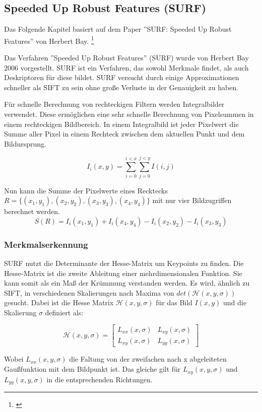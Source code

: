 \subsection{Speeded Up Robust Features (SURF)}
Das Folgende Kapitel basiert auf dem Paper ''SURF: Speeded Up Robust Features'' von Herbert Bay.
\footnote{\cite{Bay:2008:SRF:1370312.1370556}}

Das Verfahren ''Speeded Up Robust Features'' (SURF) wurde von Herbert Bay 2006 vorgestellt. SURF ist ein Verfahren, das sowohl Merkmale findet, als auch Deskriptoren für diese bildet.
SURF versucht durch einige Approximationen schneller als SIFT zu sein ohne große Verluste in der Genauigkeit zu haben.

Für schnelle Berechnung von rechteckigen Filtern werden Integralbilder verwendet. Diese ermöglichen eine sehr schnelle Berechnung von Pixelsummen in einem rechteckigen Bildbereich.
In einem Integralbild ist jeder Pixelwert die Summe aller Pixel in einem Rechteck zwischen dem aktuellen Punkt und dem Bildursprung.

\[
I_i(x, y) = \sum_{i = 0}^{i < x} \sum_{j = 0}^{j < y} I(i, j)
\]

Nun kann die Summe der Pixelwerte eines Recktecks
 $R = \{ (x_1, y_1), (x_2, y_2), (x_3, y_3), (x_4, y_4)  \}$ mit nur vier Bildzugriffen berechnet werden.
\[
S(R) = I_i(x_1, y_1) + I_i(x_4, y_4) - I_i(x_2, y_2) - I_i(x_3, y_3)
\]



\subsubsection{Merkmalserkennung}

SURF nutzt die Determinante der Hesse-Matrix um Keypoints zu finden. Die Hesse-Matrix ist die zweite Ableitung einer mehrdimensionalen Funktion. Sie kann somit als ein Maß der Krümmung verstanden werden.
Es wird, ähnlich zu SIFT, in verschiedenen Skalierungen nach Maxima von $det(\mathcal{H}(x, y, \sigma))$ gesucht. Dabei ist die Hesse Matrix $\mathcal{H}(x, y, \sigma)$ für das Bild $I(x, y)$ und die Skalierung $\sigma$ definiert als:

\[
\mathcal{H}(x, y, \sigma) = 
\begin{bmatrix}
L_{xx}(x, \sigma) & L_{xy}(x, \sigma) \\
L_{xy}(x, \sigma) & L_{yy}(x, \sigma)
\end{bmatrix}
\]

Wobei $L_{xx}(x, y, \sigma)$ die Faltung von der zweifachen nach x abgeleiteten Gaußfunktion mit dem Bildpunkt ist. Das gleiche gilt für $L_{xy}(x, y, \sigma)$ und $L_{yy}(x, y, \sigma)$ in die entsprechenden Richtungen.

